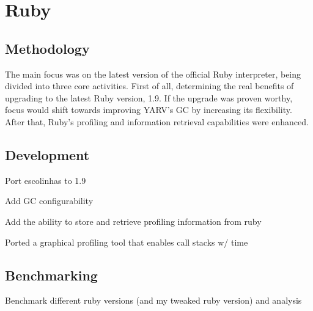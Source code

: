 \section{Ruby} %
\label{solution:sec:ruby}

\subsection{Methodology}
The main focus was on the latest version of the official Ruby interpreter, being divided into three core activities. First of all, determining the real benefits of upgrading to the latest Ruby version, 1.9. If the upgrade was proven worthy, focus would shift towards improving YARV's GC by increasing its flexibility. After that, Ruby's profiling and information retrieval capabilities were enhanced.

\begin{comment}
Determine the benefits of upgrading to the latest version, 1.9

Improve ruby 1.9's GC (main weakpoint)

Add GC configurability

Improve Ruby 1.9's profiling abilities and information retrieval
\end{comment}


\subsection{Development}
Port escolinhas to 1.9

Add GC configurability

Add the ability to store and retrieve profiling information from ruby

Ported a graphical profiling tool that enables call stacks w/ time


\subsection{Benchmarking}
Benchmark different ruby versions (and my tweaked ruby version) and analysis

